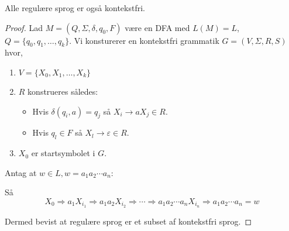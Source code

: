 \begin{theorem}
  \label{teo:cflregularity}
Alle regulære sprog er også kontekstfri.
\end{theorem}
\begin{proof}
  Lad $M = (Q, \Sigma, \delta, q_{0}, F)$ være en DFA med $L(M) = L$, $Q = \{q_{0}, q_{1}, \ldots, q_{k}\}$. Vi konsturerer en kontekstfri grammatik $G = (V, \Sigma, R, S)$ hvor,
  \begin{enumerate}
    \item $V = \{X_{0}, X_{1}, \ldots, X_{k}\}$
    \item $R$ konstrueres således:
          \begin{itemize}
            \item Hvis $\delta(q_{i},a) = q_{j}$ så $X_{i} \rightarrow a X_{j} \in R$.
            \item Hvis $q_{l} \in F$ så $X_{l} \rightarrow \varepsilon \in R$.
          \end{itemize}
    \item $X_{0}$ er startsymbolet i $G$.
  \end{enumerate}

  Antag at $w \in L, w = a_{1}a_{2} \cdots a_{n}$:
  \begin{center}

  \end{center}

  Så \[X_{0} \Rightarrow a_{1}X_{i_{1}} \Rightarrow a_{1}a_{2}X_{i_{2}} \Rightarrow \cdots \Rightarrow a_{1}a_{2} \cdots a_{n}X_{i_{n}} \Rightarrow a_{1}a_{2} \cdots a_{n} = w\]


  Dermed bevist at regulære sprog er et subset af kontekstfri sprog.
\end{proof}


